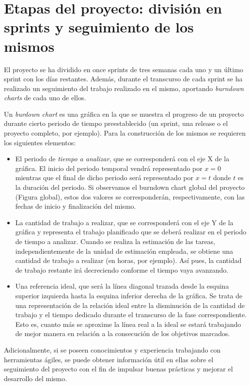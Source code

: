 \chapter{Etapas del proyecto: división en sprints y seguimiento de los mismos}\label{chapter:sprints}

El proyecto se ha dividido en once sprints de tres semanas cada uno y un último sprint con los días restantes. Además, durante el transcurso de cada sprint se ha realizado un seguimiento del trabajo realizado en el mismo, aportando \emph{burndown charts} de cada uno de ellos.

Un \emph{burdown chart} es una gráfica en la que se muestra el progreso de un proyecto durante cierto periodo de tiempo preestablecido (un sprint, una release o el proyecto completo, por ejemplo). Para la construcción de los mismos se requieren los siguientes elementos:
\begin{itemize}
\item El periodo de \emph{tiempo a analizar}, que se corresponderá con el eje X de la gráfica. El inicio del periodo temporal vendrá representado por $x = 0$ mientras que el final de dicho periodo será representado por $x = t$ donde $t$ es la duración del periodo. Si observamos el burndown chart global del proyecto (Figura global), estos dos valores se corresponderán, respectivamente, con las fechas de inicio y finalización del mismo.
\item La cantidad de trabajo a realizar, que se corresponderá con el eje Y de la gráfica y representa el trabajo planificado que se deberá realizar en el periodo de tiempo a analizar. Cuando se realiza la estimación de las tareas, independientemente de la unidad de estimación empleada, se obtiene una cantidad de trabajo a realizar (en horas, por ejemplo). Así pues, la cantidad de trabajo restante irá decreciendo conforme el tiempo vaya avanzando.
\item Una referencia ideal, que será la línea diagonal trazada desde la esquina superior izquierda hasta la esquina inferior derecha de la gráfica. Se trata de una representación de la relación ideal entre la disminución de la cantidad de trabajo y el tiempo dedicado durante el transcurso de la fase correspondiente. Esto es, cuanto más se aproxime la línea real a la ideal se estará trabajando de mejor manera en relación a la consecución de los objetivos marcados.
\end{itemize}

Adicionalmente, si se poseen conocimientos y experiencia trabajando con herramientas ágiles, se puede obtener información útil en ellas sobre el seguimiento del proyecto con el fin de impulsar buenas prácticas y mejorar el desarrollo del mismo.


